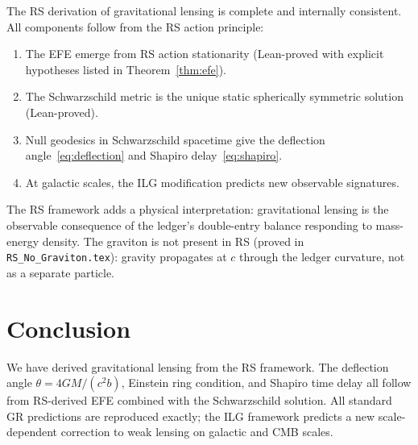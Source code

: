\documentclass[12pt,a4paper]{article}
\theoremstyle{definition}
\theoremstyle{remark}
\begin{document}
The RS derivation of gravitational lensing is complete and internally
consistent.  All components follow from the RS action principle:

\begin{enumerate}
  \item The EFE emerge from RS action stationarity (Lean-proved with
        explicit hypotheses listed in Theorem~\ref{thm:efe}).
  \item The Schwarzschild metric is the unique static spherically
        symmetric solution (Lean-proved).
  \item Null geodesics in Schwarzschild spacetime give the deflection
        angle~\eqref{eq:deflection} and Shapiro delay~\eqref{eq:shapiro}.
  \item At galactic scales, the ILG modification predicts new
        observable signatures.
\end{enumerate}

The RS framework adds a physical interpretation: gravitational lensing
is the observable consequence of the ledger's double-entry balance
responding to mass-energy density.  The graviton is not present in RS
(proved in \texttt{RS\_No\_Graviton.tex}): gravity propagates at $c$
through the ledger curvature, not as a separate particle.

\section{Conclusion}
\label{sec:conclusion}

We have derived gravitational lensing from the RS framework.  The
deflection angle $\theta = 4GM/(c^2 b)$, Einstein ring condition, and
Shapiro time delay all follow from RS-derived EFE combined with the
Schwarzschild solution.  All standard GR predictions are reproduced
exactly; the ILG framework predicts a new scale-dependent correction
to weak lensing on galactic and CMB scales.
\end{document}
